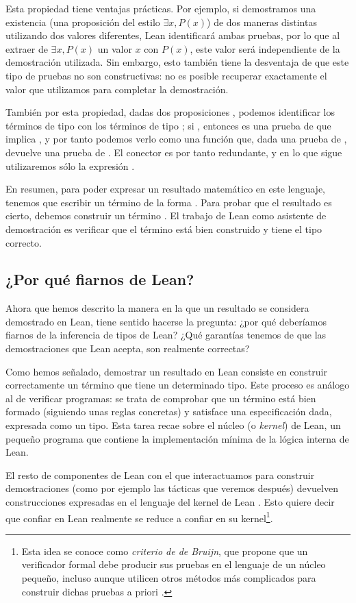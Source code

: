Esta propiedad tiene ventajas prácticas. Por ejemplo, si demostramos una existencia (una proposición del estilo $\exists x, P(x)$) de dos maneras distintas utilizando dos valores diferentes, Lean identificará ambas pruebas, por lo que al extraer de $\exists x, P(x)$ un valor $x$ con $P(x)$, este valor será independiente de la demostración utilizada. Sin embargo, esto también tiene la desventaja de que este tipo de pruebas no son constructivas: no es posible recuperar exactamente el valor que utilizamos para completar la demostración.

También por esta propiedad, dadas dos proposiciones , podemos identificar los términos de tipo  con los términos de tipo ; si , entonces  es una prueba de que  implica , y por tanto podemos verlo como una función que, dada una prueba de , devuelve una prueba de . El conector  es por tanto redundante, y en lo que sigue utilizaremos sólo la expresión \code{$\to$}.

En resumen, para poder expresar un resultado matemático en este lenguaje, tenemos que escribir un término de la forma . Para probar que el resultado es cierto, debemos construir un término . El trabajo de Lean como asistente de demostración es verificar que el término  está bien construido y tiene el tipo correcto.


\subsection{¿Por qué fiarnos de Lean?}

Ahora que hemos descrito la manera en la que un resultado se considera demostrado en Lean, tiene sentido hacerse la pregunta: ¿por qué deberíamos fiarnos de la inferencia de tipos de Lean? ¿Qué garantías tenemos de que las demostraciones que Lean acepta, son realmente correctas? 

Como hemos señalado, demostrar un resultado en Lean consiste en construir correctamente un término que tiene un determinado tipo. Este proceso es análogo al de verificar programas: se trata de comprobar que un término está bien formado (siguiendo unas reglas concretas) y satisface una especificación dada, expresada como un tipo. Esta tarea recae sobre el núcleo (o \textit{kernel}) de Lean, un pequeño programa que contiene la implementación mínima de la lógica interna de Lean.

El resto de componentes de Lean con el que interactuamos para construir demostraciones (como por ejemplo las tácticas que veremos después) devuelven construcciones expresadas en el lenguaje del kernel de Lean \cite{bailey2024type}. Esto quiere decir que confiar en Lean realmente se reduce a confiar en su kernel\footnote{Esta idea se conoce como \textit{criterio de de Bruijn}, que propone que un verificador formal debe producir sus pruebas en el lenguaje de un núcleo pequeño, incluso aunque utilicen otros métodos más complicados para construir dichas pruebas a priori \cite{bailey2024type}.}.

